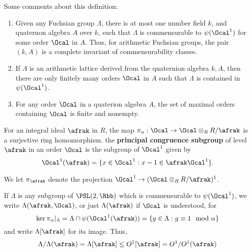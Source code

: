 \begin{rem}
	Some comments about this definition:
	\begin{enumerate}
		\item Given any Fuchsian group $\Lambda$, there is at most one number field $k$, and quaternon algebra $A$ over $k$, such that $\Lambda$ is commensurable to $\psi(\Ocal^1)$ for some order $\Ocal$ in $A$. Thus, for arithmetic Fuchsian groups, the pair $(k,A)$ is a complete invariant of commensurability classes.
		\item If $\Lambda$ is an arithmetic lattice derived from the quaternion algebra $k,A$, then there are only finitely many orders $\Ocal$ in $A$ such that $\Lambda$ is contained in $\psi(\Ocal^1)$.
		\item For any order $\Ocal$ in a quaterion algebra $A$, the set of maximal orders containing $\Ocal$ is finite and nonempty.
	\end{enumerate}
\end{rem}

For an integral ideal $\afrak$ in $R$, the map $\pi_\alpha: \Ocal \to \Ocal \otimes_R R/\afrak$ is a surjective ring homomorphism.
the \textbf{principal congruence subgroup } of level $\afrak$ in an order $\Ocal$ is the subgroup of $\Ocal^1$ given by
\begin{align*}
	\Ocal^1(\afrak) = \{ x \in \Ocal^1 : x - 1 \in \afrak \Ocal^1\}.
\end{align*}

We let $\pi_\afrak$ denote the projection $\Ocal^1 \to (\Ocal \otimes_R R/\afrak)^1$.   %

If $\Lambda$ is any subgroup of $\PSL(2,\Rbb)$ which is commensurable to $\psi(\Ocal^1)$, we write $\Lambda(\afrak,\Ocal)$, or just $\Lambda(\afrak)$ if $\Ocal$ is understood, for
\[\ker \pi_\alpha \vert_\Lambda = \Lambda \cap \psi(\Ocal^1(\afrak)) =\{g \in \Lambda: g \equiv 1 \mod \alpha\}\]
and write $\Lambda[\afrak]$ for its image. Thus,
\begin{align*}
	\Lambda / \Lambda(\afrak) =	\Lambda[\afrak] \leq O^1[\afrak]= O^1/O^1(\afrak)
\end{align*}




